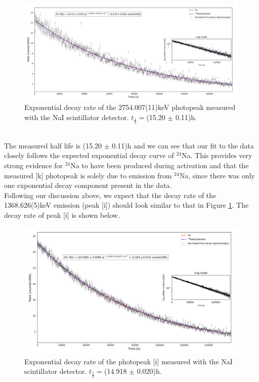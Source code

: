 \documentclass[]{article}
\begin{document}
\begin{figure}[h!]
 	\includegraphics[width = 17cm]{2754HL.png}
 	\centering
 	\captionsetup{justification=centering,margin=2cm}
 	\caption{Exponential decay rate of the 2754.007(11)keV photopeak measured with the NaI scintillator detector. $t_{\frac{1}{2}} = $(15.20 $\pm$ 0.11)h.}
 	\label{fig:DecayRate_2754Na24}
\end{figure}~\\
The measured half life is (15.20 $\pm$ 0.11)h and we can see that our fit to the data closely follows the expected exponential decay curve of ${}^{24}$Na. This provides very strong evidence for ${}^{24}$Na to have been produced during activation and that the measured [k] photopeak is solely due to emission from ${}^{24}$Na, since there was only one exponential decay component present in the data. \pagebreak \\
Following our discussion above, we expect that the decay rate of the 1368.626(5)keV emission (peak [i]) should look similar to that in Figure \ref{fig:DecayRate_2754Na24}. The decay rate of peak [i] is shown below.
\begin{figure}[h!]
	\includegraphics[width = 16cm]{1368HL.png}
	\centering
	\captionsetup{justification=centering,margin=2cm}
	\caption{Exponential decay rate of the photopeak [i] measured with the NaI scintillator detector. $t_{\frac{1}{2}} = $(14.918 $\pm$ 0.020)h.}
	\label{fig:DecayRate_1368.62Na24}
\end{figure}~\\
\end{document}
